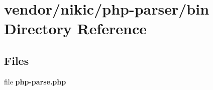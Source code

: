 \section{vendor/nikic/php-\/parser/bin Directory Reference}
\label{dir_c679753a7116309f7129eef020cea2da}
\subsection*{Files}
\begin{DoxyCompactItemize}
\item 
file {\bf php-\/parse.\+php}
\end{DoxyCompactItemize}
